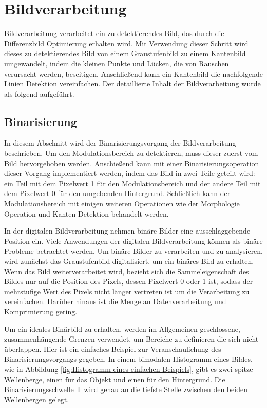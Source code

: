 \section{Bildverarbeitung}

Bildverarbeitung verarbeitet ein zu detektierendes Bild, das durch die Differenzbild Optimierung erhalten wird. Mit Verwendung dieser Schritt wird dieses zu detektierendes Bild von einem Graustufenbild zu einem Kantenbild umgewandelt, indem die kleinen Punkte und Lücken, die von Rauschen verursacht werden, beseitigen. Anschließend kann ein Kantenbild die nachfolgende Linien Detektion vereinfachen. Der detaillierte Inhalt der Bildverarbeitung wurde als folgend aufgeführt. 


\subsection{Binarisierung}

In diesem Abschnitt wird der Binarisierungsvorgang der Bildverarbeitung beschrieben. Um den Modulationsbereich zu detektieren, muss dieser zuerst vom Bild hervorgehoben werden. Anschießend kann mit einer Binarisierungsoperation dieser Vorgang implementiert werden, indem das Bild in zwei Teile geteilt wird: ein Teil mit dem Pixelwert 1 für den Modulationsbereich und der andere Teil mit dem Pixelwert 0 für den umgebenden Hintergrund. Schließlich kann der Modulationsbereich mit einigen weiteren Operationen wie der Morphologie Operation und Kanten Detektion behandelt werden.

In der digitalen Bildverarbeitung nehmen binäre Bilder eine ausschlaggebende Position ein. Viele Anwendungen der digitalen Bildverarbeitung können als binäre Probleme betrachtet werden. Um binäre Bilder zu verarbeiten und zu analysieren, wird zunächst das Graustufenbild digitalisiert, um ein binäres Bild zu erhalten. Wenn das Bild weiterverarbeitet wird, bezieht sich die Sammeleigenschaft des Bildes nur auf die Position des Pixels, dessen Pixelwert 0 oder 1 ist, sodass der mehrstufige Wert des Pixels nicht länger vertreten ist um die Verarbeitung zu vereinfachen. Darüber hinaus ist die Menge an Datenverarbeitung und Komprimierung gering. 

Um ein ideales Binärbild zu erhalten, werden im Allgemeinen geschlossene, zusammenhängende Grenzen verwendet, um Bereiche zu definieren die sich nicht überlappen. Hier ist ein einfaches Beispiel zur Veranschaulichung des Binarisierungsvorgangs gegeben. In einem bimodalen Histogramm eines Bildes, wie in Abbildung \ref{fig:Histogramm eines einfachen Beispiels}, gibt es zwei spitze Wellenberge, einen für das Objekt und einen für den Hintergrund. Die Binarisierungsschwelle T wird genau an die tiefste Stelle zwischen den beiden Wellenbergen gelegt. 

